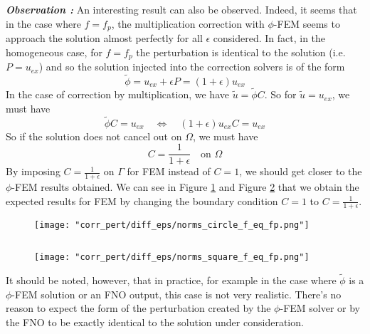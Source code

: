 \begin{enumerate}[label=\textbullet]
	\textbf{\textit{Observation :}} An interesting result can also be observed. Indeed, it seems that in the case where $f=f_p$, the multiplication correction with $\phi$-FEM seems to approach the solution almost perfectly for all $\epsilon$ considered.
	In fact, in the homogeneous case, for $f=f_p$ the perturbation is identical to the solution (i.e. $P=u_{ex}$) and so the solution injected into the correction solvers is of the form
	\begin{equation*}
		\tilde{\phi}=u_{ex}+\epsilon P=(1+\epsilon)u_{ex}
	\end{equation*}
	In the case of correction by multiplication, we have $\tilde{u}=\tilde{\phi}C$. So for $\tilde{u}=u_{ex}$, we must have
	\begin{equation*}
		\tilde{\phi}C=u_{ex} \quad \iff \quad (1+\epsilon)u_{ex}C=u_{ex}
	\end{equation*}
	So if the solution does not cancel out on $\Omega$, we must have
	\begin{equation*}
		C=\frac{1}{1+\epsilon} \quad \text{on } \Omega
	\end{equation*}
	By imposing $C=\frac{1}{1+\epsilon}$ on $\Gamma$ for FEM instead of $C=1$, we should get closer to the $\phi$-FEM results obtained. We can see in Figure \ref{norms_circle_f_eq_fp} and Figure \ref{norms_square_f_eq_fp} that we obtain the expected results for FEM by changing the boundary condition $C=1$ to $C=\frac{1}{1+\epsilon}$.
	
	\begin{minipage}{0.48\linewidth}
		\begin{figure}[H]
			\centering
			\texttt{[image: "corr\_pert/diff\_eps/norms\_circle\_f\_eq\_fp.png"]}
			\label{norms_circle_f_eq_fp}
		\end{figure} 
	\end{minipage} $\qquad$
	\begin{minipage}{0.48\linewidth}
		\begin{figure}[H]
			\centering
			\texttt{[image: "corr\_pert/diff\_eps/norms\_square\_f\_eq\_fp.png"]}
			\label{norms_square_f_eq_fp}
		\end{figure} 
	\end{minipage}
	
	\begin{Rem}
		It should be noted, however, that in practice, for example in the case where $\tilde{\phi}$ is a $\phi$-FEM solution or an FNO output, this case is not very realistic. There's no reason to expect the form of the perturbation created by the $\phi$-FEM solver or by the FNO to be exactly identical to the solution under consideration.
	\end{Rem}
	

\end{enumerate}
